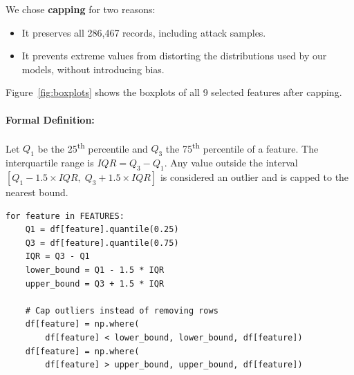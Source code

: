 We chose \textbf{capping} for two reasons:
\begin{itemize}
    \item It preserves all 286,467 records, including attack samples.
    \item It prevents extreme values from distorting the distributions used by our models, without introducing bias.
\end{itemize}

Figure~\ref{fig:boxplots} shows the boxplots of all 9 selected features after capping.

\paragraph{Formal Definition:} Let $Q_1$ be the 25\textsuperscript{th} percentile and $Q_3$ the 75\textsuperscript{th} percentile of a feature. The interquartile range is $IQR = Q_3 - Q_1$. Any value outside the interval $[Q_1 - 1.5 \times IQR,\; Q_3 + 1.5 \times IQR]$ is considered an outlier and is capped to the nearest bound.

\begin{lstlisting}[caption={Outlier capping using the IQR method}]
for feature in FEATURES:
    Q1 = df[feature].quantile(0.25)
    Q3 = df[feature].quantile(0.75)
    IQR = Q3 - Q1
    lower_bound = Q1 - 1.5 * IQR
    upper_bound = Q3 + 1.5 * IQR

    # Cap outliers instead of removing rows
    df[feature] = np.where(
        df[feature] < lower_bound, lower_bound, df[feature])
    df[feature] = np.where(
        df[feature] > upper_bound, upper_bound, df[feature])
\end{lstlisting}


